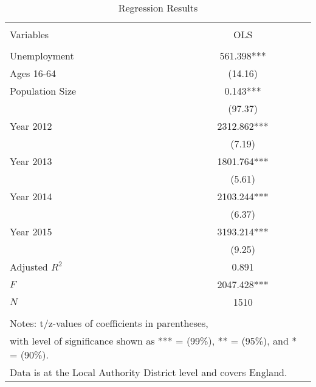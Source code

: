 \documentclass{article}\usepackage[]{graphicx}\usepackage[]{color}
\begin{document}
\begin{table}[htbp]
\makeatletter
\setlength{\belowcaptionskip}{-2cm}   %
\long\def\@makecaption#1#2{%
  \vskip\abovecaptionskip
  \sbox\@tempboxa{#1: #2}%
  \ifdim \wd\@tempboxa >\hsize
    #1: #2\par
  \else
    \global \@minipagefalse
    \hb@xt@\hsize{\hspace{1.20in}\box\@tempboxa\hfil}%
  \fi  
  \vskip\belowcaptionskip}
\makeatother
\caption{Regression Results}
\vspace{1.8cm}
\begin{center}
\begin{tabular}{l c}
	\hline\hline\\[-1.5ex]
	Variables 						& OLS \\[0.5ex]
	\hline\\[-1.5ex]
	Unemployment					& 561.398***	\\[0ex]
  Ages 16-64						& (14.16) \\[1.5ex]
	Population Size 			& 0.143***	                \\[0ex]
												& (97.37)         \\[1.5ex]
	Year 2012     				& 2312.862***	      \\[0ex]
												& (7.19)    \\[1.5ex]
	Year 2013   					& 1801.764***	      \\[0ex]
		                  	& (5.61)    \\[1.5ex]
	Year 2014							&	2103.244***	      \\[0ex]
	                      & (6.37)    \\[1.5ex]
	Year 2015             & 3193.214***	      \\[0ex]
												& (9.25)    \\[1.5ex]
	Adjusted $R^2$				&	0.891				                                                                    \\[1.5ex]
	$F$										&	2047.428***				                        \\[1.5ex]
	$N$										&	1510						                                                                                \\[0.5ex]
	\hline\\[-1.5ex]
	\multicolumn{2}{l}{\footnotesize{Notes: t/z-values of coefficients in parentheses,}}\\
	\multicolumn{2}{l}{\footnotesize{with level of significance shown as *** = (99\%), ** = (95\%), and * = (90\%).}}\\
	\multicolumn{2}{l}{\footnotesize{Data is at the Local Authority District level and covers England.}}\\
\end{tabular}
\end{center}
\label{RegressionResults}
\end{table}
\end{document}
